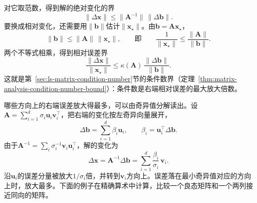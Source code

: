 对它取范数，得到解的绝对变化的界
\[
 \lVert\Delta\bm x\rVert\leq\lVert\bm A^{-1}\rVert\,\lVert\Delta\bm b\rVert .
\]
要换成相对变化，还需要用$\lVert\bm b\rVert$估计$\lVert\bm x_\star\rVert$。由$\bm b=\bm A\bm x_\star$，
\[
 \lVert\bm b\rVert\leq\lVert\bm A\rVert\,\lVert\bm x_\star\rVert,\qquad\text{即}\qquad \frac1{\lVert\bm x_\star\rVert}\leq\frac{\lVert\bm A\rVert}{\lVert\bm b\rVert}.
\]
两个不等式相乘，得到相对误差界
\begin{equation}
 \frac{\lVert\Delta\bm x\rVert}{\lVert\bm x_\star\rVert}\leq\kappa(\bm A)\,\frac{\lVert\Delta\bm b\rVert}{\lVert\bm b\rVert}.
 \label{eq:ls-rhs-relative-error-bound}
\end{equation}
这就是第~\ref{sec:ls-matrix-condition-number}节的条件数界（定理~\ref{thm:matrix-analysis-condition-number-bound}）：条件数是右端相对误差的最大放大倍数。

哪些方向上的右端误差放大得最多，可以由奇异值分解读出。设$\bm A=\sum_{i=1}^d\sigma_i\bm u_i\bm v_i^\top$，把右端的变化按左奇异向量展开，
\[
 \Delta\bm b=\sum_{i=1}^d\beta_i\bm u_i,\qquad \beta_i=\bm u_i^\top\Delta\bm b .
\]
由于$\bm A^{-1}=\sum_i\sigma_i^{-1}\bm v_i\bm u_i^\top$，解的变化为
\begin{equation}
 \Delta\bm x=\bm A^{-1}\Delta\bm b=\sum_{i=1}^d\frac{\beta_i}{\sigma_i}\,\bm v_i .
 \label{eq:ls-rhs-perturbation-svd}
\end{equation}
沿$\bm u_i$的误差分量被放大$1/\sigma_i$倍，并转到$\bm v_i$方向上。误差落在最小奇异值对应的方向上时，放大最多。下面的例子在精确算术中计算，比较一个良态矩阵和一个两列接近同向的矩阵。

